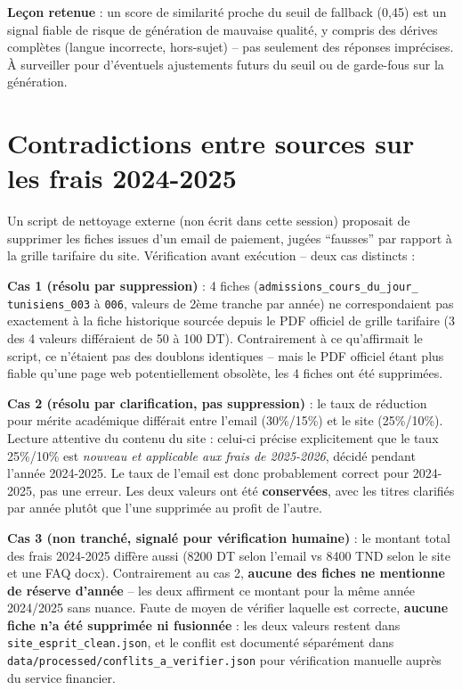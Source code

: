 \documentclass[11pt,a4paper]{report}
\begin{document}
\begin{noteinfo}
\textbf{Leçon retenue} : un score de similarité proche du seuil de fallback (0,45) est
un signal fiable de risque de génération de mauvaise qualité, y compris des dérives
complètes (langue incorrecte, hors-sujet) -- pas seulement des réponses imprécises. À
surveiller pour d'éventuels ajustements futurs du seuil ou de garde-fous sur la
génération.
\end{noteinfo}

\section{Contradictions entre sources sur les frais 2024-2025}
Un script de nettoyage externe (non écrit dans cette session) proposait de supprimer les
fiches issues d'un email de paiement, jugées ``fausses'' par rapport à la grille
tarifaire du site. Vérification avant exécution -- deux cas distincts :

\textbf{Cas 1 (résolu par suppression)} : 4 fiches (\texttt{admissions\_cours\_du\_jour\_
tunisiens\_003} à \texttt{006}, valeurs de 2ème tranche par année) ne correspondaient pas
exactement à la fiche historique sourcée depuis le PDF officiel de grille tarifaire (3
des 4 valeurs différaient de 50 à 100 DT). Contrairement à ce qu'affirmait le script, ce
n'étaient pas des doublons identiques -- mais le PDF officiel étant plus fiable qu'une
page web potentiellement obsolète, les 4 fiches ont été supprimées.

\textbf{Cas 2 (résolu par clarification, pas suppression)} : le taux de réduction pour
mérite académique différait entre l'email (30\%/15\%) et le site (25\%/10\%). Lecture
attentive du contenu du site : celui-ci précise explicitement que le taux 25\%/10\% est
\emph{nouveau et applicable aux frais de 2025-2026}, décidé pendant l'année 2024-2025.
Le taux de l'email est donc probablement correct pour 2024-2025, pas une erreur. Les deux
valeurs ont été \textbf{conservées}, avec les titres clarifiés par année plutôt que l'une
supprimée au profit de l'autre.

\textbf{Cas 3 (non tranché, signalé pour vérification humaine)} : le montant total des
frais 2024-2025 diffère aussi (8200 DT selon l'email vs 8400 TND selon le site et une FAQ
docx). Contrairement au cas 2, \textbf{aucune des fiches ne mentionne de réserve
d'année} -- les deux affirment ce montant pour la même année 2024/2025 sans nuance.
Faute de moyen de vérifier laquelle est correcte, \textbf{aucune fiche n'a été supprimée
ni fusionnée} : les deux valeurs restent dans \texttt{site\_esprit\_clean.json}, et le
conflit est documenté séparément dans \texttt{data/processed/conflits\_a\_verifier.json}
pour vérification manuelle auprès du service financier.
\end{document}
